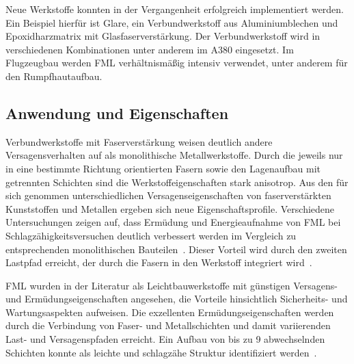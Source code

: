 Neue Werkstoffe konnten in der Vergangenheit erfolgreich implementiert werden.
Ein Beispiel hierfür ist Glare, ein Verbundwerkstoff aus Aluminiumblechen und Epoxidharzmatrix mit Glasfaserverstärkung.
Der Verbundwerkstoff wird in verschiedenen Kombinationen unter anderem im A380 eingesetzt.
Im Flugzeugbau werden FML verhältnismäßig intensiv verwendet, unter anderem für den Rumpfhautaufbau\cite{Airbus,Vlot2001}.

\subsection{Anwendung und Eigenschaften}\label{subsec:anwendung}

Verbundwerkstoffe mit Faserverstärkung weisen deutlich andere Versagensverhalten auf als monolithische Metallwerkstoffe.
Durch die jeweils nur in eine bestimmte Richtung orientierten Fasern sowie den Lagenaufbau mit getrennten Schichten sind die Werkstoffeigenschaften stark anisotrop.
Aus den für sich genommen unterschiedlichen Versagenseigenschaften von faserverstärkten Kunststoffen und Metallen ergeben sich neue Eigenschaftsprofile.
Verschiedene Untersuchungen zeigen auf, dass Ermüdung und Energieaufnahme von FML bei Schlagzähigkeitsversuchen deutlich verbessert werden im Vergleich zu entsprechenden monolithischen Bauteilen~\cite{Cortes.2005,Botelho.2006}.
Dieser Vorteil wird durch den zweiten Lastpfad erreicht, der durch die Fasern in den Werkstoff integriert wird~\cite{Beumler2004}.

FML wurden in der Literatur als Leichtbauwerkstoffe mit günstigen Versagens- und Ermüdungseigenschaften angesehen, die Vorteile hinsichtlich Sicherheits- und Wartungsaspekten aufweisen.
Die exzellenten Ermüdungseigenschaften werden durch die Verbindung von Faser- und Metallschichten und damit variierenden Last- und Versagenspfaden erreicht.
Ein Aufbau von bis zu 9 abwechselnden Schichten konnte als leichte und schlagzähe Struktur identifiziert werden~\cite{Paernaenen2012}.

